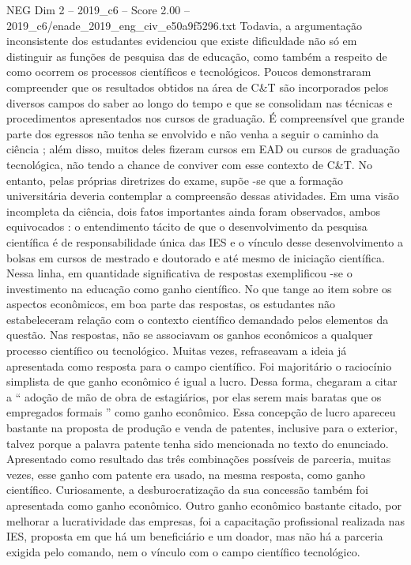\begin{textsample}{NEG Dim 2 – 2019\_c6 – Score 2.00 – 2019\_c6/enade\_2019\_eng\_civ\_e50a9f5296.txt}
Todavia, a argumentação inconsistente dos estudantes evidenciou que existe dificuldade não só em distinguir as funções de pesquisa das de educação, como também a respeito de como ocorrem os processos científicos e tecnológicos.
Poucos demonstraram compreender que os resultados obtidos na área de C\&T são incorporados pelos diversos campos do saber ao longo do tempo e que se consolidam nas técnicas e procedimentos apresentados nos cursos de graduação.
É compreensível que grande parte dos egressos não tenha se envolvido e não venha a seguir o caminho da ciência ; além disso, muitos deles fizeram cursos em EAD ou cursos de graduação tecnológica, não tendo a chance de conviver com esse contexto de C\&T.
No entanto, pelas próprias diretrizes do exame, supõe -se que a formação universitária deveria contemplar a compreensão dessas atividades.
Em uma visão incompleta da ciência, dois fatos importantes ainda foram observados, ambos equivocados : o entendimento tácito de que o desenvolvimento da pesquisa científica é de responsabilidade única das IES e o vínculo desse desenvolvimento a bolsas em cursos de mestrado e doutorado e até mesmo de iniciação científica.
Nessa linha, em quantidade significativa de respostas exemplificou -se o investimento na educação como ganho científico.
No que tange ao item sobre os aspectos econômicos, em boa parte das respostas, os estudantes não estabeleceram relação com o contexto científico demandado pelos elementos da questão.
Nas respostas, não se associavam os ganhos econômicos a qualquer processo científico ou tecnológico.
Muitas vezes, refraseavam a ideia já apresentada como resposta para o campo científico.
Foi majoritário o raciocínio simplista de que ganho econômico é igual a lucro.
Dessa forma, chegaram a citar a “ adoção de mão de obra de estagiários, por elas serem mais baratas que os empregados formais ” como ganho econômico.
Essa concepção de lucro apareceu bastante na proposta de produção e venda de patentes, inclusive para o exterior, talvez porque a palavra patente tenha sido mencionada no texto do enunciado.
Apresentado como resultado das três combinações possíveis de parceria, muitas vezes, esse ganho com patente era usado, na mesma resposta, como ganho científico.
Curiosamente, a desburocratização da sua concessão também foi apresentada como ganho econômico.
Outro ganho econômico bastante citado, por melhorar a lucratividade das empresas, foi a capacitação profissional realizada nas IES, proposta em que há um beneficiário e um doador, mas não há a parceria exigida pelo comando, nem o vínculo com o campo científico tecnológico.

\end{textsample}

